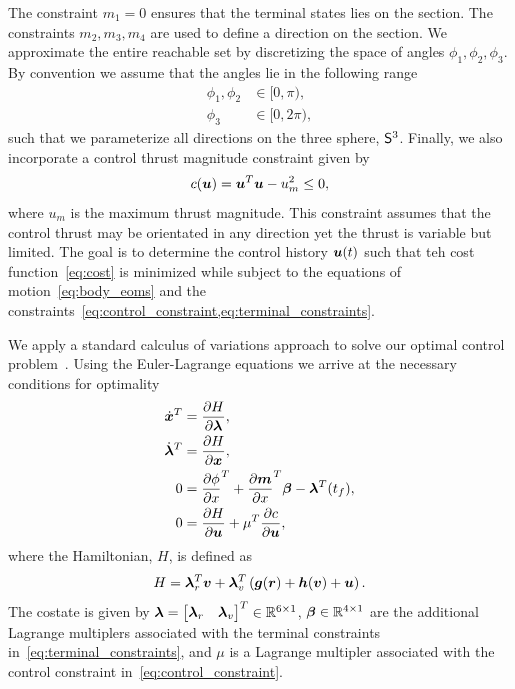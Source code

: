 \documentclass[]{aiaa-tc}%
\begin{document}
The constraint \( m_1 = 0 \) ensures that the terminal states lies on the \Poincare section.
The constraints \( m_2, m_3, m_4 \) are used to define a direction on the \Poincare section.
We approximate the entire reachable set by discretizing the space of angles \(\phi_1, \phi_2, \phi_3 \).
By convention we assume that the angles lie in the following range
\begin{align*}
    \phi_1, \phi_2 &\in [ 0, \pi ) ,\\
    \phi_3 &\in [ 0 , 2 \pi ) ,
\end{align*}
such that we parameterize all directions on the three sphere, \(\S^3\).
Finally, we also incorporate a control thrust magnitude constraint given by
\begin{align}\label{eq:control_constraint}
    c(\vecbf{u}) = \vecbf{u}^T \vecbf{u} - u_m^2 \leq 0 ,
\end{align}
where \( u_m \) is the maximum thrust magnitude.
This constraint assumes that the control thrust may be orientated in any direction yet the thrust is variable but limited.
The goal is to determine the control history \( \vecbf{u}(t) \) such that teh cost function~\cref{eq:cost} is minimized while subject to the equations of motion~\cref{eq:body_eoms} and the constraints~\cref{eq:control_constraint,eq:terminal_constraints}.

We apply a standard calculus of variations approach to solve our optimal control problem~\cite{bryson2002}.
Using the Euler-Lagrange equations we arrive at the necessary conditions for optimality
\begin{align}\label{eq:necc_conditions}
    \begin{split}
        \dot{\vecbf{x}} ^T &= \deriv{H}{\vecbf{\lambda}} ,\\
        \dot{\vecbf{\lambda}}^T &= \deriv{H}{\vecbf{x}} , \\
        0 &= \deriv{\phi}{x}^T + \deriv{\vecbf{m}}{x}^T \vecbf{\beta} - \vecbf{\lambda}^T(t_f) , \\
        0 &= \deriv{H}{\vecbf{u}} + \mu^T \deriv{c}{\vecbf{u}} ,
    \end{split}
\end{align}
where the Hamiltonian, \( H\), is defined as
\begin{align}\label{eq:hamiltonian}
    H = \vecbf{\lambda}_r^T \vecbf{v} + \vecbf{\lambda}_v^T \parenth{\vecbf{g}(\vecbf{r}) + \vecbf{h}(\vecbf{v}) + \vecbf{u}}.
\end{align}
The costate is given by \( \vecbf{\lambda} = \begin{bmatrix} \vecbf{\lambda}_r & \vecbf{\lambda}_v \end{bmatrix}^T \in \R^{6 \times 1}\), \( \vecbf{\beta} \in \R^{4 \times 1} \) are the additional Lagrange multiplers associated with the terminal constraints in~\cref{eq:terminal_constraints}, and \( \mu \) is a Lagrange multipler associated with the control constraint in~\cref{eq:control_constraint}.
\end{document}
